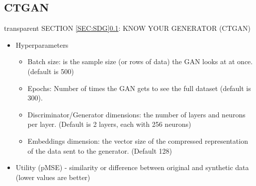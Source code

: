 \documentclass[t,8pt,utfx8]{beamer}
\begin{document}
\begin{spacing}{1.25}



\subsection{CTGAN}\label{sec:sdg_ctgan}
\begin{frame}[c,plain]
\vskip-4mm
\begin{beamercolorbox}[wd=\boxwidth,ht=22.11mm]{transparent}%
    \vfill%
    \leftinsert%
    \MakeUppercase{Section \ref{sec:sdg}\ref{sec:sdg_ctgan}: Know your generator (CTGAN)} %
\end{beamercolorbox}
\vskip-3mm
\small

\begin{itemize}
    \item Hyperparameters
        \begin{itemize}
            \item Batch size: is the sample size (or rows of data) the GAN looks at at once. (default is 500)
            \item Epochs: Number of times the GAN gets to see the full dataset (default is 300).
            \item Discriminator/Generator dimensions: the number of layers and neurons per layer.  (Default is 2 layers, each with 256 neurons)
            \item Embeddings dimension: the vector size of the compressed representation of the data sent to the generator.  (Default 128)
        \end{itemize}
    \item Utility (pMSE) - similarity or difference between original and synthetic data (lower values are better)
\end{itemize}


\end{frame}
\end{spacing}
\end{document}
